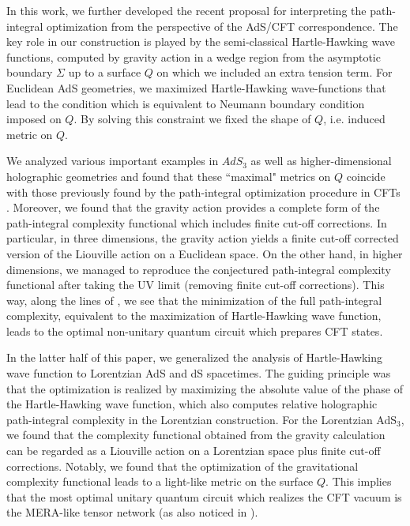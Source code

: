 \documentclass[a4paper,12pt]{article}
\begin{document}
In this work, we further developed the recent proposal for interpreting the path-integral optimization \cite{Boruch:2020wax} from the perspective of the AdS/CFT correspondence. The key role in our construction is played by the semi-classical Hartle-Hawking wave functions, computed by gravity action in a wedge region from the asymptotic boundary $\Sigma$ up to a surface $Q$ on which we included an extra tension term. For Euclidean AdS geometries, we maximized  Hartle-Hawking wave-functions that lead to the condition which is equivalent to Neumann boundary condition imposed on $Q$. By solving this constraint we fixed the shape of $Q$, i.e. induced metric on $Q$. 

We analyzed various important examples in $AdS_3$ as well as higher-dimensional holographic geometries and found that these ``maximal" metrics on $Q$ coincide with those previously found by the path-integral optimization procedure in CFTs \cite{Caputa:2017urj}. Moreover, we found that the gravity action provides a complete form of the 
path-integral complexity functional which includes finite cut-off corrections. In particular, in three dimensions, 
the gravity action yields a finite cut-off corrected version of the Liouville action on a Euclidean space. On the other hand, in higher dimensions, we managed to reproduce the conjectured path-integral complexity functional after taking the UV limit (removing finite cut-off corrections). This way, along the lines of \cite{Takayanagi:2018pml}, we see that the minimization of the full path-integral complexity, equivalent to the maximization of Hartle-Hawking wave function, leads to the optimal non-unitary quantum circuit which prepares CFT states. 

In the latter half of this paper, we generalized the analysis of Hartle-Hawking wave function to Lorentzian AdS and dS spacetimes. The guiding principle was that the optimization is realized by maximizing the absolute value of the phase of the Hartle-Hawking wave function, which also computes relative holographic path-integral complexity in the Lorentzian construction. For the Lorentzian AdS$_{3}$, we found that the complexity functional obtained from the gravity calculation can be regarded as a Liouville action on a Lorentzian space plus finite cut-off corrections. Notably, we found that the optimization of the gravitational complexity functional leads to a light-like metric on the surface  $Q$. This implies that the most optimal unitary quantum circuit which realizes the CFT vacuum is the MERA-like tensor network (as also noticed in \cite{Milsted:2018san,Takayanagi:2018pml}). 
\end{document}
